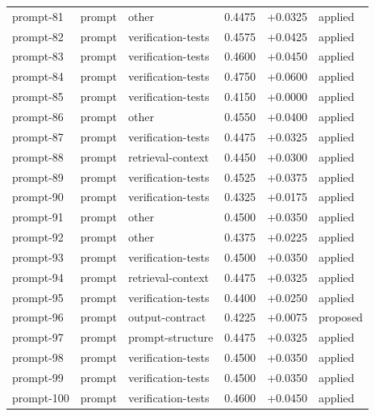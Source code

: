 \begin{center}
\begin{longtable}{llp{5.2cm}rrl}
prompt-81 & prompt & other & 0.4475 & +0.0325 & applied \\
prompt-82 & prompt & verification-tests & 0.4575 & +0.0425 & applied \\
prompt-83 & prompt & verification-tests & 0.4600 & +0.0450 & applied \\
prompt-84 & prompt & verification-tests & 0.4750 & +0.0600 & applied \\
prompt-85 & prompt & verification-tests & 0.4150 & +0.0000 & applied \\
prompt-86 & prompt & other & 0.4550 & +0.0400 & applied \\
prompt-87 & prompt & verification-tests & 0.4475 & +0.0325 & applied \\
prompt-88 & prompt & retrieval-context & 0.4450 & +0.0300 & applied \\
prompt-89 & prompt & verification-tests & 0.4525 & +0.0375 & applied \\
prompt-90 & prompt & verification-tests & 0.4325 & +0.0175 & applied \\
prompt-91 & prompt & other & 0.4500 & +0.0350 & applied \\
prompt-92 & prompt & other & 0.4375 & +0.0225 & applied \\
prompt-93 & prompt & verification-tests & 0.4500 & +0.0350 & applied \\
prompt-94 & prompt & retrieval-context & 0.4475 & +0.0325 & applied \\
prompt-95 & prompt & verification-tests & 0.4400 & +0.0250 & applied \\
prompt-96 & prompt & output-contract & 0.4225 & +0.0075 & proposed \\
prompt-97 & prompt & prompt-structure & 0.4475 & +0.0325 & applied \\
prompt-98 & prompt & verification-tests & 0.4500 & +0.0350 & applied \\
prompt-99 & prompt & verification-tests & 0.4500 & +0.0350 & applied \\
prompt-100 & prompt & verification-tests & 0.4600 & +0.0450 & applied \\
\bottomrule\end{longtable}\end{center}
\clearpage
